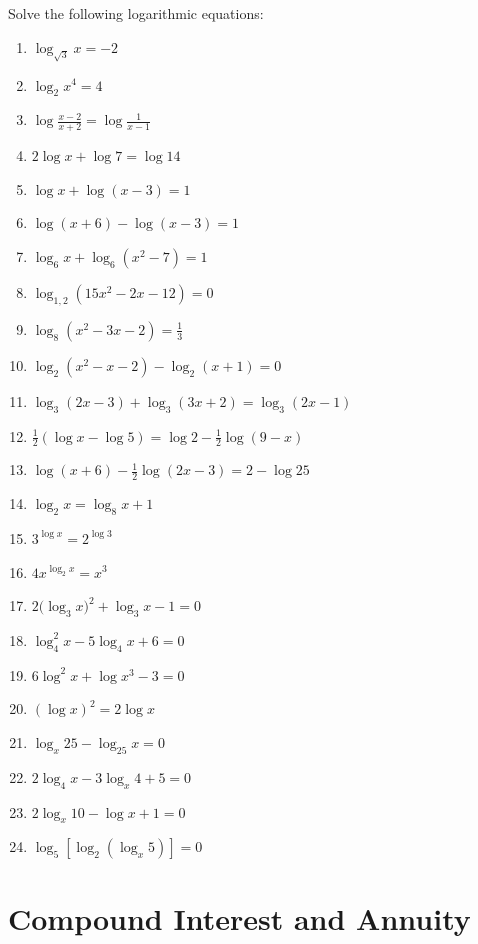\documentclass[12pt]{report}
\begin{document}
\setlength{\columnseprule}{1pt}
\setlength{\columnsep}{24pt}
\begin{multicols}{2}
  Solve the following logarithmic equations:
  \begin{enumerate}
    \item $\log_{\sqrt{3}}x=-2$
    \item $\log_{2}x^{4}=4$
    \item $\log{\frac{x-2}{x+2}}=\log{\frac{1}{x-1}}$
    \item $2\log x+\log7=\log14$
    \item $\log x+\log\left(x-3\right)=1$
    \item $\log\left(x+6\right)-\log\left(x-3\right)=1$
    \item $\log_{6}x+\log_{6}(x^{2}-7)=1$
    \item $\log_{1,2}(15x^{2}-2x-12)=0$
    \item $\log_{8}(x^{2}-3x-2)={\frac{1}{3}}$
    \item $\log_{2}(x^{2}-x-2)-\log_{2}(x+1)=0$
    \item $\log_{3}(2x-3)+\log_{3}(3x+2)=\log_{3}(2x-1)$
    \item $\frac{1}{2}(\log x-\log5)=\log2-\frac{1}{2}\log(9-x)$
    \item $\log\left(x+6\right)-{\frac{1}{2}}\log\left(2x-3\right)=2-\log25$
    \item $\log_{2}x=\log_{8}x+1$
    \item $3^{\log x}=2^{\log3}$
    \item $4x^{\log_{2}x}=x^{3}$
    \item $2\bigl(\log_{3}x\bigr)^{2}+\log_{3}x-1=0$
    \item $\log_{4}^{2}x-5\log_{4}x+6=0$
    \item $6\log^{2}x+\log x^{3}-3=0$
    \item $(\log x)^{2}=2\log x$
    \item $\log_{x}25-\log_{25}x=0$
    \item $2\log_{4}x-3\log_{x}4+5=0$
    \item $2\log_{x}10-\log x+1=0$
    \item $\log_{5}\left[\log_{2}\left(\log_{x}5\right)\right]=0$
  \end{enumerate}
\end{multicols}

\section{Compound Interest and Annuity}
\end{document}
